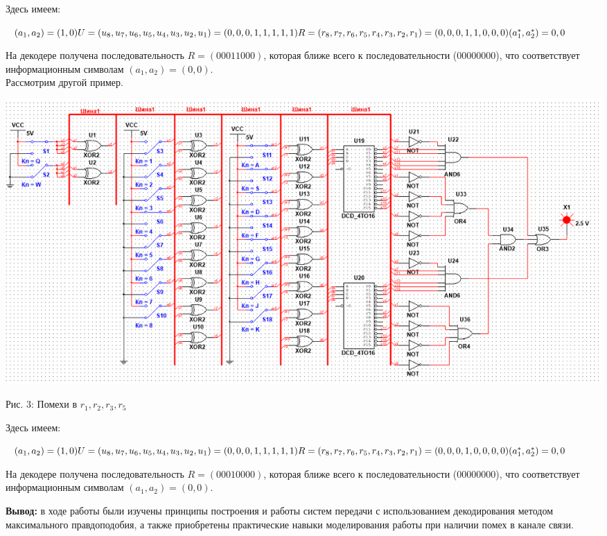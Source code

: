 \documentclass[14pt]{article}
\begin{document}
Здесь имеем:
\begin{center}
    $(a_{1}, a_{2}) = (1, 0)\\
    U = (u_{8}, u_{7}, u_{6}, u_{5}, u_{4}, u_{3}, u_{2}, u_{1}) = (0, 0, 0, 1, 1, 1, 1, 1)\\
    R = (r_{8}, r_{7}, r_{6}, r_{5}, r_{4}, r_{3}, r_{2}, r_{1}) = (0, 0, 0, 1, 1, 0, 0, 0)\\
    (a_{1}^{*}, a_{2}^{*}) = {0, 0} 
    $
\end{center}

На декодере получена последовательность $R = (00011000)$, которая ближе всего к последовательности (00000000), что соответствует информационным символам $(a_{1}, a_{2}) = (0, 0)$.\\
Рассмотрим другой пример.

\includegraphics[width=1\linewidth]{1235.png}
\begin{center}
    Рис. 3: Помехи в $r_{1}, r_{2}, r_{3}, r_{5}$
\end{center}
Здесь имеем:
\begin{center}
    $(a_{1}, a_{2}) = (1, 0)\\
    U = (u_{8}, u_{7}, u_{6}, u_{5}, u_{4}, u_{3}, u_{2}, u_{1}) = (0, 0, 0, 1, 1, 1, 1, 1)\\
    R = (r_{8}, r_{7}, r_{6}, r_{5}, r_{4}, r_{3}, r_{2}, r_{1}) = (0, 0, 0, 1, 0, 0, 0, 0)\\
    (a_{1}^{*}, a_{2}^{*}) = {0, 0} 
    $
\end{center}

На декодере получена последовательность $R = (00010000)$, которая ближе всего к последовательности (00000000), что соответствует информационным символам $(a_{1}, a_{2}) = (0, 0)$. 

\textbf{Вывод:} в ходе работы были изучены принципы построения и работы систем передачи с использованием декодирования методом максимального правдоподобия, а также приобретены практические навыки моделирования работы при наличии помех в канале связи.
\end{document}

